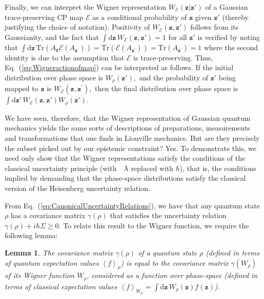 \documentclass[pra,superscriptaddress,nofootinbib,12pt]{revtex4-2}
\newtheorem{lemma}[theorem]{Lemma}
\begin{document}
Finally, we can interpret the Wigner representation $W_{\mathcal{E}}(\mathbf{z}|\mathbf{z}')$ of a Gaussian trace-preserving CP map $\mathcal{E}$ as a conditional probability of $\mathbf{z}$ given $\mathbf{z}'$ (thereby justifying the choice of notation).  Positivity of $W_{\mathcal{E}}(\mathbf{z},\mathbf{z}')$ follows from its Gaussianity, and the fact that $\int \mathrm{d}\mathbf{z}\, W_{\mathcal{E}}(\mathbf{z},\mathbf{z}')=1$ for all $\mathbf{z}'$ is verified by noting that $\int \mathrm{d}\mathbf{z}\, \mathrm{Tr}\left( A_{\mathbf{z}}\mathcal{E}(A_{\mathbf{z}^{\prime }})\right) =\mathrm{Tr}\left(
\mathcal{E}(A_{\mathbf{z}^{\prime }})\right) =\mathrm{Tr}\left( A_{\mathbf{z}^{\prime }}\right) =1$ where the second identity is due to the assumption that $\mathcal{E}$ is trace-preserving.  Thus, Eq.~(\ref{eq:Wigneractionofmap}) can be interpreted as follows.  If the initial distribution over phase space is $W_{\rho}(\mathbf{z}'),$ and the probability of $\mathbf{z}'$ being mapped to $\mathbf{z}$ is $W_{\mathcal{E}}(\mathbf{z},\mathbf{z}^{\prime }),$ then the final distribution over phase space is $\int\mathrm{d}\mathbf{z}'\, W_{\mathcal{E}}(\mathbf{z},\mathbf{z}')W_{\rho}(\mathbf{z}')$.

We have seen, therefore, that the Wigner representation of Gaussian quantum mechanics yields the same sorts of descriptions of preparations, measurements and transformations that one finds in Liouville mechanics.  But are they precisely the subset picked out by our epistemic constraint?  Yes.  To demonstrate this, we need only show that the Wigner representations satisfy the conditions of the classical uncertainty principle (with $\lambdabar$ replaced with $\hbar$), that is, the conditions implied by demanding that the phase-space distributions satisfy the classical version of the Heisenberg uncertainty relation.

From Eq.~(\ref{eq:CanonicalUncertaintyRelations}), we have that any quantum state $\rho$ has a covariance matrix $\gamma(\rho)$ that satisfies the uncertainty relation $\gamma (\rho)+i\hbar \Sigma \geq 0$.  To relate this result to the Wigner function, we require the following lemma:

\begin{lemma}
The covariance matrix $\gamma(\rho)$ of a quantum state $\rho$ (defined in terms of quantum expectation values $\left\langle f\right\rangle_{\rho}$) is equal to the covariance matrix $\gamma (W_{\rho})$ of its Wigner function $W_{\rho}$, considered as a function over phase-space (defined in terms of classical expectation values $\left\langle f\right\rangle_{W_{\rho}}=\int \mathrm{d}\mathbf{z}\,W_{\rho}(\mathbf{z})f(\mathbf{z})$).
\end{lemma}
\end{document}
